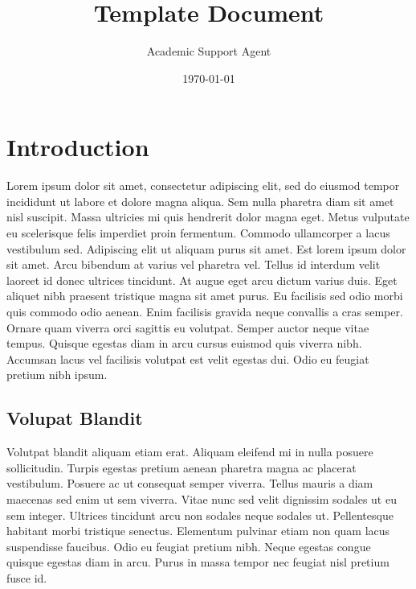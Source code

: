 \documentclass{article}
\title{Template Document}
\author{Academic Support Agent}
\date{\today}
\begin{document}
\maketitle






\normalsize
\mdseries





\newpage


\doublespacing
\frenchspacing

\setcounter{page}{1}

\chapter{Introduction}

Lorem ipsum dolor sit amet, consectetur adipiscing elit, sed do eiusmod tempor incididunt ut labore et dolore magna aliqua. Sem nulla pharetra diam sit amet nisl suscipit. Massa ultricies mi quis hendrerit dolor magna eget. Metus vulputate eu scelerisque felis imperdiet proin fermentum. Commodo ullamcorper a lacus vestibulum sed. Adipiscing elit ut aliquam purus sit amet. Est lorem ipsum dolor sit amet. Arcu bibendum at varius vel pharetra vel. Tellus id interdum velit laoreet id donec ultrices tincidunt. At augue eget arcu dictum varius duis. Eget aliquet nibh praesent tristique magna sit amet purus. Eu facilisis sed odio morbi quis commodo odio aenean. Enim facilisis gravida neque convallis a cras semper. Ornare quam viverra orci sagittis eu volutpat. Semper auctor neque vitae tempus. Quisque egestas diam in arcu cursus euismod quis viverra nibh. Accumsan lacus vel facilisis volutpat est velit egestas dui. Odio eu feugiat pretium nibh ipsum.

\section{Volupat Blandit}

Volutpat blandit aliquam etiam erat. Aliquam eleifend mi in nulla posuere sollicitudin. Turpis egestas pretium aenean pharetra magna ac placerat vestibulum. Posuere ac ut consequat semper viverra. Tellus mauris a diam maecenas sed enim ut sem viverra. Vitae nunc sed velit dignissim sodales ut eu sem integer. Ultrices tincidunt arcu non sodales neque sodales ut. Pellentesque habitant morbi tristique senectus. Elementum pulvinar etiam non quam lacus suspendisse faucibus. Odio eu feugiat pretium nibh. Neque egestas congue quisque egestas diam in arcu. Purus in massa tempor nec feugiat nisl pretium fusce id.
\end{document}

